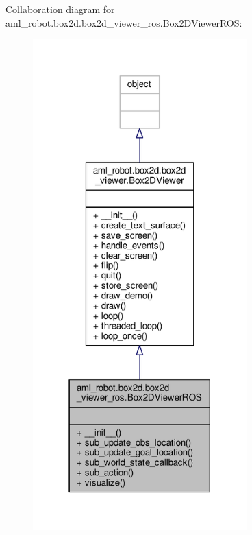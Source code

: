 Collaboration diagram for aml\-\_\-robot.\-box2d.\-box2d\-\_\-viewer\-\_\-ros.\-Box2\-D\-Viewer\-R\-O\-S\-:\nopagebreak
\begin{figure}[H]
\begin{center}
\leavevmode
\includegraphics[width=234pt]{classaml__robot_1_1box2d_1_1box2d__viewer__ros_1_1_box2_d_viewer_r_o_s__coll__graph}
\end{center}
\end{figure}
